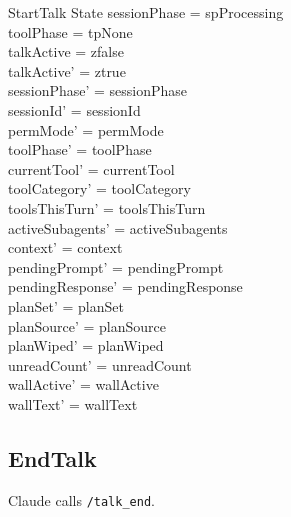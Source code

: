 \documentclass[a4paper,10pt,fleqn]{article}
\begin{document}
\begin{schema}{StartTalk}
  \Delta State
  \where
  sessionPhase = spProcessing \\
  toolPhase = tpNone \\
  talkActive = zfalse \\
  talkActive' = ztrue \\
  sessionPhase' = sessionPhase \\
  sessionId' = sessionId \\
  permMode' = permMode \\
  toolPhase' = toolPhase \\
  currentTool' = currentTool \\
  toolCategory' = toolCategory \\
  toolsThisTurn' = toolsThisTurn \\
  activeSubagents' = activeSubagents \\
  context' = context \\
  pendingPrompt' = pendingPrompt \\
  pendingResponse' = pendingResponse \\
  planSet' = planSet \\
  planSource' = planSource \\
  planWiped' = planWiped \\
  unreadCount' = unreadCount \\
  wallActive' = wallActive \\
  wallText' = wallText
\end{schema}

\subsection{EndTalk}

Claude calls \texttt{/talk\_end}.
\end{document}
